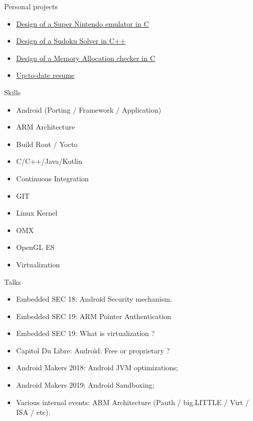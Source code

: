\documentclass[a4paper, 10pt]{article}
\begin{document}
\begin{unbreakableSection} {Personal projects}
    \begin{projects}
	\begin{itemize}[parsep=0cm,itemsep=0cm,topsep=0cm]
	    \item \href{https://github.com/grassead/snesemu}{Design of a Super Nintendo emulator in C}
	    \item \href{https://github.com/grassead/sudokusolver}{Design of a Sudoku Solver in C++}
	    \item \href{https://github.com/grassead/memorychecker}{Design of a Memory Allocation checker in C}
	    \item \href{https://github.com/grassead/cv}{Up-to-date resume}
	\end{itemize}
    \end{projects}
\end{unbreakableSection}

\begin{section} {Skills}
    \begin{skills}
	\begin{itemize}[parsep=0cm,itemsep=0cm,topsep=0cm]
	    \item Android (Porting / Framework / Application)
		\item ARM Architecture
	    \item Build Root / Yocto
	    \item C/C++/Java/Kotlin
	    \item Continuous Integration
	    \item GIT
	    \item Linux Kernel
	    \item OMX
	    \item OpenGL ES
	    \item Virtualization
	\end{itemize}
    \end{skills}
\end{section}

\begin{section} {Talks}
    \begin{skills}
	\begin{itemize}[parsep=0cm,itemsep=0cm,topsep=0cm]
	    \item Embedded SEC 18: Android Security mechanism.
	    \item Embedded SEC 19: ARM Pointer Authentication
	    \item Embedded SEC 19: What is virtualization ?
	    \item Capitol Du Libre: Android: Free or proprietary ?
	    \item Android Makers 2018: Android JVM optimizations;
	    \item Android Makers 2019: Android Sandboxing;
	    \item Various internal events: ARM Architecture (Pauth / big.LITTLE / Virt / ISA / etc).
	\end{itemize}
    \end{skills}
\end{section}
\end{document}
